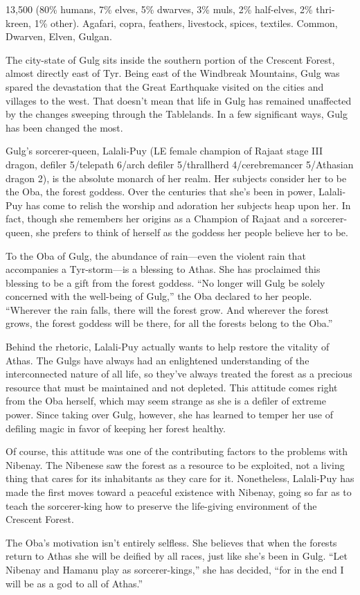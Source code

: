 {13,500 (80\% humans, 7\% elves, 5\% dwarves, 3\% muls, 2\% half-elves, 2\% thri-kreen, 1\% other).}
{Agafari, copra, feathers, livestock, spices, textiles.}
{Common, Dwarven, Elven, Gulgan.}
{
	The city-state of Gulg sits inside the southern portion of the Crescent Forest, almost directly east of Tyr. Being east of the Windbreak Mountains, Gulg was spared the devastation that the Great Earthquake visited on the cities and villages to the west. That doesn't mean that life in Gulg has remained unaffected by the changes sweeping through the Tablelands. In a few significant ways, Gulg has been changed the most.

	Gulg's sorcerer-queen, Lalali-Puy (LE female champion of Rajaat stage III dragon, defiler 5/telepath 6/arch defiler 5/thrallherd 4/cerebremancer 5/Athasian dragon 2), is the absolute monarch of her realm. Her subjects consider her to be the Oba, the forest goddess. Over the centuries that she's been in power, Lalali-Puy has come to relish the worship and adoration her subjects heap upon her. In fact, though she remembers her origins as a Champion of Rajaat and a sorcerer-queen, she prefers to think of herself as the goddess her people believe her to be.

	To the Oba of Gulg, the abundance of rain---even the violent rain that accompanies a Tyr-storm---is a blessing to Athas. She has proclaimed this blessing to be a gift from the forest goddess. ``No longer will Gulg be solely concerned with the well-being of Gulg,'' the Oba declared to her people. ``Wherever the rain falls, there will the forest grow. And wherever the forest grows, the forest goddess will be there, for all the forests belong to the Oba.''

	Behind the rhetoric, Lalali-Puy actually wants to help restore the vitality of Athas. The Gulgs have always had an enlightened understanding of the interconnected nature of all life, so they've always treated the forest as a precious resource that must be maintained and not depleted. This attitude comes right from the Oba herself, which may seem strange as she is a defiler of extreme power. Since taking over Gulg, however, she has learned to temper her use of defiling magic in favor of keeping her forest healthy.

	Of course, this attitude was one of the contributing factors to the problems with Nibenay. The Nibenese saw the forest as a resource to be exploited, not a living thing that cares for its inhabitants as they care for it. Nonetheless, Lalali-Puy has made the first moves toward a peaceful existence with Nibenay, going so far as to teach the sorcerer-king how to preserve the life-giving environment of the Crescent Forest.

	The Oba's motivation isn't entirely selfless. She believes that when the forests return to Athas she will be deified by all races, just like she's been in Gulg. ``Let Nibenay and Hamanu play as sorcerer-kings,'' she has decided, ``for in the end I will be as a god to all of Athas.''
}
